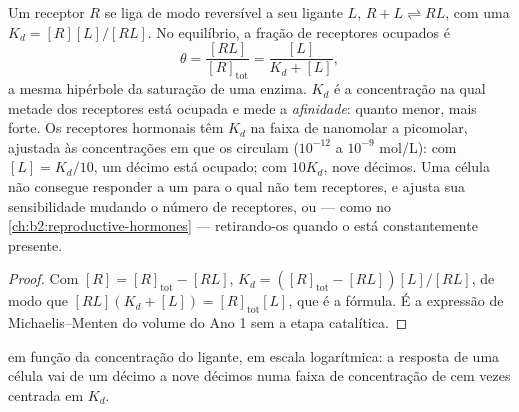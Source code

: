 \begin{theorem}\label{thm:b2:cell-signalling:occupancy}
Um receptor $R$ se liga de modo reversível a seu ligante $L$, $R + L
\rightleftharpoons RL$, com uma \emph{} $K_d =
[R][L]/[RL]$. No equilíbrio, a fração de receptores ocupados é
\[
\theta = \frac{[RL]}{[R]_{\text{tot}}} = \frac{[L]}{K_d + [L]},
\]
a mesma hipérbole da saturação de uma enzima. $K_d$ é a concentração na
qual metade dos receptores está ocupada e mede a \emph{afinidade}:
quanto menor, mais forte. Os receptores hormonais têm
$K_d$ na faixa de nanomolar a picomolar, ajustada às concentrações em
que os  circulam ($10^{-12}$ a
$10^{-9}$ mol/L): com $[L] = K_d/10$, um décimo está ocupado; com
$10K_d$, nove décimos. Uma célula não consegue responder a um 
para o qual não tem receptores, e ajusta sua sensibilidade mudando o
número de receptores, ou --- como no \cref{ch:b2:reproductive-hormones} --- retirando-os quando o
 está constantemente presente.
\end{theorem}
\begin{proof}
Com $[R] = [R]_{\text{tot}} - [RL]$, $K_d = ([R]_{\text{tot}} -
[RL])[L]/[RL]$, de modo que $[RL](K_d + [L]) = [R]_{\text{tot}}[L]$, que
é a fórmula. É a expressão de Michaelis--Menten do volume do Ano 1 sem
a etapa catalítica.
\end{proof}

\begin{omfigure}

{\small {} em função da concentração do ligante,
em escala logarítmica: a resposta de uma célula vai de um décimo a nove
décimos numa faixa de concentração de cem vezes centrada em $K_d$.}
\end{omfigure}

